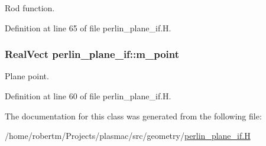 Rod function. 



Definition at line 65 of file perlin\+\_\+plane\+\_\+if.\+H.

\subsubsection[{\texorpdfstring{m\+\_\+point}{m_point}}]{\setlength{\rightskip}{0pt plus 5cm}Real\+Vect perlin\+\_\+plane\+\_\+if\+::m\+\_\+point\hspace{0.3cm}{\ttfamily [protected]}}\hypertarget{classperlin__plane__if_a4c4c709480400dfeb56349b1d61c8dc1}{}\label{classperlin__plane__if_a4c4c709480400dfeb56349b1d61c8dc1}


Plane point. 



Definition at line 60 of file perlin\+\_\+plane\+\_\+if.\+H.



The documentation for this class was generated from the following file\+:\begin{DoxyCompactItemize}
\item 
/home/robertm/\+Projects/plasmac/src/geometry/\hyperlink{perlin__plane__if_8H}{perlin\+\_\+plane\+\_\+if.\+H}\end{DoxyCompactItemize}
